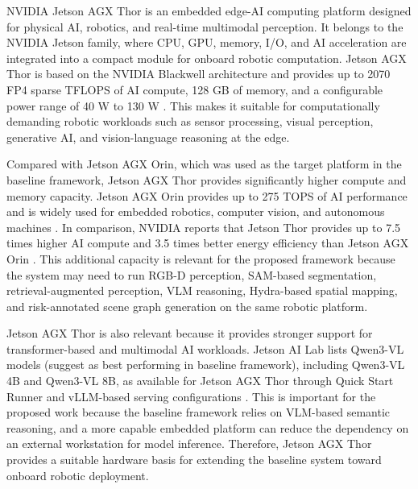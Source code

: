 {\small

NVIDIA Jetson AGX Thor is an embedded edge-AI computing platform designed for physical AI, robotics, and real-time multimodal perception. It belongs to the NVIDIA Jetson family, where CPU, GPU, memory, I/O, and AI acceleration are integrated into a compact module for onboard robotic computation. Jetson AGX Thor is based on the NVIDIA Blackwell architecture and provides up to 2070 FP4 sparse TFLOPS of AI compute, 128 GB of memory, and a configurable power range of 40 W to 130 W \cite{nvidia_jetson_thor}. This makes it suitable for computationally demanding robotic workloads such as sensor processing, visual perception, generative AI, and vision-language reasoning at the edge.

Compared with Jetson AGX Orin, which was used as the target platform in the baseline framework, Jetson AGX Thor provides significantly higher compute and memory capacity. Jetson AGX Orin provides up to 275 TOPS of AI performance and is widely used for embedded robotics, computer vision, and autonomous machines \cite{nvidia_jetson_orin}. In comparison, NVIDIA reports that Jetson Thor provides up to 7.5 times higher AI compute and 3.5 times better energy efficiency than Jetson AGX Orin \cite{nvidia_jetson_thor}. This additional capacity is relevant for the proposed framework because the system may need to run RGB-D perception, SAM-based segmentation, retrieval-augmented perception, VLM reasoning, Hydra-based spatial mapping, and risk-annotated scene graph generation on the same robotic platform.

Jetson AGX Thor is also relevant because it provides stronger support for transformer-based and multimodal AI workloads. Jetson AI Lab lists Qwen3-VL models (suggest as best performing in baseline framework), including Qwen3-VL 4B and Qwen3-VL 8B, as available for Jetson AGX Thor through Quick Start Runner and vLLM-based serving configurations \cite{jetson_ai_lab_models}. This is important for the proposed work because the baseline framework relies on VLM-based semantic reasoning, and a more capable embedded platform can reduce the dependency on an external workstation for model inference. Therefore, Jetson AGX Thor provides a suitable hardware basis for extending the baseline system toward onboard robotic deployment.

}












